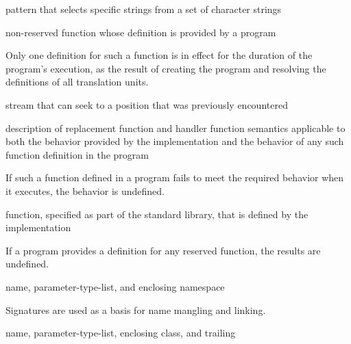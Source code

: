 pattern that selects specific strings
from a set of character strings

%
non-reserved function
whose definition is provided by a \Cpp{} program

\begin{defnote}
Only one definition for such a function is in effect for the duration of the program's
execution, as the result of creating the program and resolving the
definitions of all translation units.
\end{defnote}

%
stream that can seek to a position that was previously encountered

%
description of replacement function and handler function semantics
applicable to both the behavior provided by the implementation and
the behavior of any such function definition in the program

\begin{defnote}
If such a function defined in a \Cpp{} program fails to meet the required
behavior when it executes, the behavior is undefined.%
\end{defnote}

%
function, specified as part of the \Cpp{} standard library, that is defined by the
implementation

\begin{defnote}
If a \Cpp{} program provides a definition for any reserved function, the results are undefined.%
\end{defnote}

%
name,
parameter-type-list,
and enclosing namespace

\begin{defnote}
Signatures are used as a basis for
name mangling and linking.
\end{defnote}

%
name,
parameter-type-list,
enclosing class,
and
trailing 

